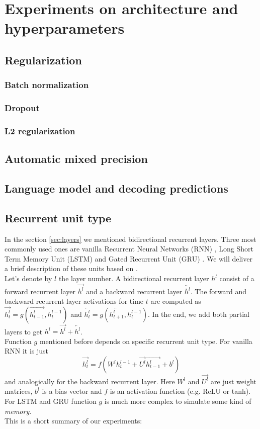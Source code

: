 \documentclass[licencjacka,en]{pracamgr}
\begin{document}
\chapter{Experiments on architecture and hyperparameters}\label{r:hypers}

\section{Regularization}
\subsection{Batch normalization}
\subsection{Dropout}
\subsection{L2 regularization}

\section{Automatic mixed precision}

\section{Language model and decoding predictions}

\section{Recurrent unit type}
In the section \ref{sec:layers} we mentioned bidirectional recurrent layers. Three most commonly used ones are vanilla Recurrent Neural Networks (RNN) \cite{RNN}, Long Short Term Memory Unit (LSTM) \cite{LSTM} and Gated Recurrent Unit (GRU) \cite{GRU}. We will deliver a brief description of these units based on \cite{DS2}. \\
Let's denote by $l$ the layer number. A bidirectional recurrent layer $h^l$ consist of a forward recurrent layer $\overrightarrow{h^l}$ and a backward recurrent layer $\overleftarrow{h^l}$. The forward and backward recurrent layer activations for time $t$ are computed as $\overrightarrow{h^l_t} = g(\overrightarrow{h^l_{t - 1}}, h^{l-1}_t)$ and $\overleftarrow{h^l_t} = g(\overleftarrow{h^l_{t+1}}, h^{l-1}_t)$. In the end, we add both partial layers to get $h^l = \overrightarrow{h^l} + \overleftarrow{h^l}$.\\
Function $g$ mentioned before depends on specific recurrent unit type. For vanilla RNN it is just
$$\overrightarrow{h^l_t} = f(W^l h^{l-1}_t + \overrightarrow{U^l} \overrightarrow{h^l_{t - 1}} + b^l)$$
and analogically for the backward recurrent layer. Here $W^l$ and $\overrightarrow{U^l}$ are just weight matrices, $b^l$ is a bias vector and $f$ is an activation function (e.g. ReLU or tanh). For LSTM and GRU function $g$ is much more complex to simulate some kind of \textit{memory}.\\
This is a short summary of our experiments:
\end{document}
